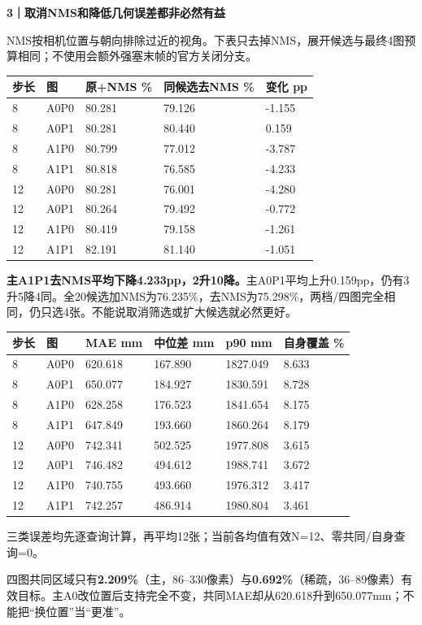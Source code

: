 \documentclass[11pt,a4paper,fontset=none]{ctexart}
\newcommand{\subhead}[1]{\vspace{3pt}{\large\bfseries\color{hypothesis1}#1}\par}
\begin{document}
\newpage
{\LARGE\bfseries\color{hypothesis1}3｜取消NMS和降低几何误差都非必然有益}\par
NMS按相机位置与朝向排除过近的视角。下表只去掉NMS，展开候选与最终4图预算相同；不使用会额外强塞末帧的官方关闭分支。
\begin{tabularx}{\linewidth}{@{}llXXX@{}}\toprule
步长 & 图 & 原+NMS \% & 同候选去NMS \% & 变化 pp \\\midrule
8 & A0P0 & 80.281 & 79.126 & -1.155 \\
8 & A0P1 & 80.281 & 80.440 & 0.159 \\
8 & A1P0 & 80.799 & 77.012 & -3.787 \\
8 & A1P1 & 80.818 & 76.585 & -4.233 \\
12 & A0P0 & 80.281 & 76.001 & -4.280 \\
12 & A0P1 & 80.264 & 79.492 & -0.772 \\
12 & A1P0 & 80.419 & 79.158 & -1.261 \\
12 & A1P1 & 82.191 & 81.140 & -1.051 \\\bottomrule\end{tabularx}
\textbf{主A1P1去NMS平均下降4.233pp，2升10降。}主A0P1平均上升0.159pp，仍有3升5降4同。全20候选加NMS为76.235\%，去NMS为75.298\%，两档/四图完全相同，仍只选4张。不能说取消筛选或扩大候选就必然更好。
\subhead{四图共同区域误差与各图自身覆盖}
\begin{tabularx}{\linewidth}{@{}llXXXX@{}}\toprule
步长 & 图 & MAE mm & 中位差 mm & p90 mm & 自身覆盖 \% \\\midrule
8 & A0P0 & 620.618 & 167.890 & 1827.049 & 8.633 \\
8 & A0P1 & 650.077 & 184.927 & 1830.591 & 8.728 \\
8 & A1P0 & 628.258 & 176.523 & 1841.654 & 8.175 \\
8 & A1P1 & 647.849 & 193.660 & 1860.264 & 8.179 \\
12 & A0P0 & 742.341 & 502.525 & 1977.808 & 3.615 \\
12 & A0P1 & 746.482 & 494.612 & 1988.741 & 3.672 \\
12 & A1P0 & 740.755 & 493.660 & 1976.312 & 3.417 \\
12 & A1P1 & 742.257 & 486.914 & 1980.804 & 3.461 \\\bottomrule\end{tabularx}
{\small 三类误差均先逐查询计算，再平均12张；当前各均值有效N=12、零共同/自身查询=0。}

四图共同区域只有\textbf{2.209\%}（主，86--330像素）与\textbf{0.692\%}（稀疏，36--89像素）有效目标。主A0改位置后支持完全不变，共同MAE却从620.618升到650.077mm；不能把“换位置”当“更准”。
\end{document}
